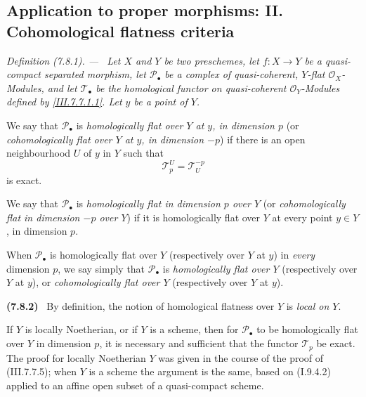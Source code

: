 \documentclass[10pt,oneside]{book}
\newcommand{\sh}[1]{\mathscr{#1}}
\newcommand{\sref}[2][]{(#2)}
\newcommand{\oldpage}[2][]{\setcounter{footnote}{0}\marginpar{\scriptsize\textbf{#1}~|~#2}\ignorespaces}
\newenvironment{env}[1][]{\par\medskip\noindent\textbf{(#1)}\ }{\par}
\newenvironment{definition}[1][]{\par\medskip\noindent\itshape Definition (#1). ---\ }{\par}
\begin{document}
\subsection{Application to proper morphisms: II. Cohomological flatness criteria}
\label{subsection:III.7.8}
\label{III.7.8}

\begin{definition}[7.8.1]
\label{III.7.8.1}
Let $X$ and $Y$ be two preschemes, let $f:X\to Y$ be a
quasi-compact separated morphism, let $\sh{P}_\bullet$ be a
complex of quasi-coherent, $Y$-flat $\sh{O}_X$-Modules, and
let $\sh{T}_\bullet$ be the homological functor on
quasi-coherent $\sh{O}_Y$-Modules defined by
\eqref{III.7.7.1.1}.  Let $y$ be a point of $Y$.

\oldpage[III]{205}
We say that $\sh{P}_\bullet$ is \emph{homologically flat over
$Y$ at $y$, in dimension $p$} (or \emph{cohomologically flat
over $Y$ at $y$, in dimension $-p$}) if there is an open
neighbourhood $U$ of $y$ in $Y$ such that
\[
  \sh{T}_p^U=\sh{T}^{-p}_U
\]
is exact.

We say that $\sh{P}_\bullet$ is \emph{homologically flat in
dimension $p$ over $Y$} (or \emph{cohomologically flat in
dimension $-p$ over $Y$}) if it is homologically flat over
$Y$ at every point $y\in Y$, in dimension $p$.

When $\sh{P}_\bullet$ is homologically flat over $Y$
(respectively over $Y$ at $y$) in \emph{every} dimension
$p$, we say simply that $\sh{P}_\bullet$ is
\emph{homologically flat over $Y$} (respectively over $Y$ at
$y$), or \emph{cohomologically flat over $Y$} (respectively
over $Y$ at $y$).
\end{definition}

\begin{env}[7.8.2]
\label{III.7.8.2}
By definition, the notion of homological flatness over $Y$
is \emph{local on $Y$}.

If $Y$ is locally Noetherian, or if $Y$ is a scheme, then
for $\sh{P}_\bullet$ to be homologically flat over $Y$ in
dimension $p$, it is necessary and sufficient that the
functor $\sh{T}_p$ be exact.  The proof for locally
Noetherian $Y$ was given in the course of the proof of
\sref{III.7.7.5}; when $Y$ is a scheme the argument is the
same, based on \sref[I]{I.9.4.2} applied to an affine open
subset of a quasi-compact scheme.
\end{env}
\end{document}
